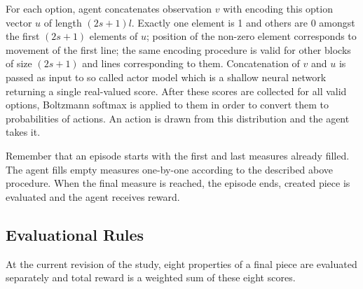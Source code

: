 \documentclass{article}
\begin{document}
For each option, agent concatenates observation $v$ with encoding this option vector $u$ of length $(2s + 1)l$. Exactly one element is 1 and others are 0 amongst the first $(2s + 1)$ elements of $u$; position of the non-zero element corresponds to movement of the first line; the same encoding procedure is valid for other blocks of size $(2s + 1)$ and lines corresponding to them. Concatenation of $v$ and $u$ is passed as input to so called actor model which is a shallow neural network returning a single real-valued score. After these scores are collected for all valid options, Boltzmann softmax is applied to them in order to convert them to probabilities of actions. An action is drawn from this distribution and the agent takes it.

Remember that an episode starts with the first and last measures already filled. The agent fills empty measures one-by-one according to the described above procedure. When the final measure is reached, the episode ends, created piece is evaluated and the agent receives reward.

\subsection{Evaluational Rules}
\label{subsec:setup}

At the current revision of the study, eight properties of a final piece are evaluated separately and total reward is a weighted sum of these eight scores.
\end{document}
